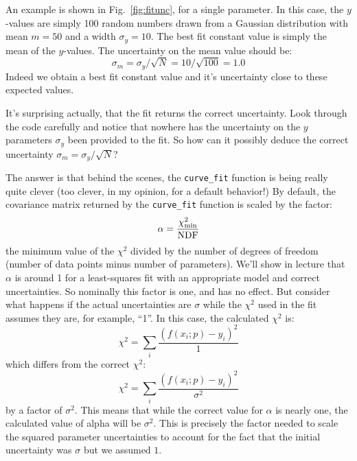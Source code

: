An example is shown in Fig.~\ref{fig:fitunc}, for a single parameter.
In this case, the $y$-values are simply 100 random numbers drawn from
a Gaussian distribution with mean $m = 50$ and a width $\sigma_y =10$.
The best fit constant value is simply the mean of the $y$-values.  The
uncertainty on the mean value should be:
\begin{displaymath}
\sigma_m = \sigma_y / \sqrt{N} = 10 / \sqrt{100} = 1.0
\end{displaymath}
Indeed we obtain a best fit constant value and it's uncertainty close
to these expected values.

It's surprising actually, that the fit returns the correct
uncertainty.  Look through the code carefully and notice that nowhere
has the uncertainty on the $y$ parameters $\sigma_y$ been provided to
the fit.  So how can it possibly deduce the correct uncertainty
$\sigma_m = \sigma_y / \sqrt{N}$?

The answer is that behind the scenes, the {\tt curve{\_}fit} function
is being really quite clever (too clever, in my opinion, for a default
behavior!)  By default, the covariance matrix returned by the 
{\tt curve{\_}fit} function is scaled by the factor:
\begin{displaymath}
\alpha = \frac{\chi^2_{\rm min}}{\rm NDF}
\end{displaymath}
the minimum value of the $\chi^2$ divided by the number of degrees of
freedom (number of data points minus number of parameters).  We'll
show in lecture that $\alpha$ is around 1 for a least-squares fit with
an appropriate model and correct uncertainties.  So nominally this
factor is one, and has no effect.  But consider what happens if the
actual uncertainties are $\sigma$ while the $\chi^2$ used in the fit assumes they
are, for example, ``1''.  In this case, the calculated $\chi^2$ is:
\begin{displaymath}
\chi^2 = \sum_i \frac{(f(x_i;p) - y_i) ^2}{1}
\end{displaymath}
which differs from the correct $\chi^2$:
\begin{displaymath}
\chi^2 = \sum_i \frac{(f(x_i;p) - y_i) ^2}{\sigma^2}
\end{displaymath}
by a factor of $\sigma^2$.  This means that while the correct value
for $\alpha$ is nearly one, the calculated value of alpha will be
$\sigma^2$.  This is precisely the factor needed to scale the squared
parameter uncertainties to account for the fact that the initial
uncertainty was $\sigma$ but we assumed $1$.

